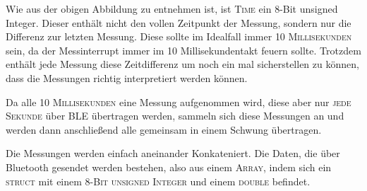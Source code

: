 Wie aus der obigen Abbildung zu entnehmen ist, ist \textsc{Time} ein 8-Bit unsigned Integer. Dieser enthält nicht den vollen Zeitpunkt der Messung, sondern nur die Differenz zur letzten Messung. Diese sollte im Idealfall immer \textsc{10 Millisekunden} sein, da der Messinterrupt immer im 10 Millisekundentakt feuern sollte. Trotzdem enthält jede Messung diese Zeitdifferenz um noch ein mal sicherstellen zu können, dass die Messungen richtig interpretiert werden können.

Da alle \textsc{10 Millisekunden} eine Messung aufgenommen wird, diese aber nur \textsc{jede Sekunde} über \ac{BLE} übertragen werden, sammeln sich diese Messungen an und werden dann anschließend alle gemeinsam in einem Schwung übertragen.

\begin{figure}[htb]
    \centering
\end{figure}

Die Messungen werden einfach aneinander Konkateniert. Die Daten, die über Bluetooth gesendet werden bestehen, also aus einem \textsc{Array}, indem sich ein \textsc{struct} mit einem \textsc{8-Bit unsigned Integer} und einem \textsc{double} befindet.